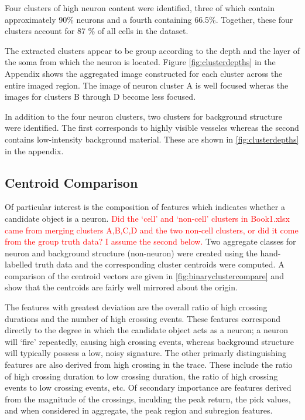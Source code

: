 \documentclass[10pt]{article}
\newcommand{\todo}[1]{\textcolor{red}{#1}}
\begin{document}
Four clusters of high neuron content were identified, three of which contain approximately \num{90}\% neurons and a fourth containing \num{66.5}\%. Together, these four clusters account for \num{87}
\% of all cells in the dataset.

The extracted clusters appear to be group according to the depth and the layer of the soma from which the neuron is located. 
Figure \cref{fig:clusterdepths} in the Appendix shows the aggregated image constructed for each cluster across the entire imaged region. 
The image of neuron cluster A is well focused wheras the images for clusters B through D become less focused. 

In addition to the four neuron clusters, two clusters for background structure were identified. The first corresponds to highly visible vesseles whereas the second contains low-intensity background material. These are shown in \cref{fig:clusterdepths} in the appendix.

\subsection{Centroid Comparison}

Of particular interest is the composition of features which indicates whether a candidate object is a neuron. 
\todo{Did the `cell' and `non-cell' clusters in Book1.xlsx came from merging clusters A,B,C,D and the two non-cell clusters, or did it come from the group truth data? I assume the second below.}
Two aggregate classes for neuron and background structure (non-neuron) were created using the hand-labelled truth data and the corresponding cluster centroids were computed.
A comparison of the centroid vectors are given in \cref{fig:binaryclustercompare} and show that the centroids are fairly well mirrored about the origin.

The features with greatest deviation are the overall ratio of high crossing durations and the number of high crossing events. These features correspond directly to the degree in which the candidate object acts as a neuron; a neuron will `fire' repeatedly, causing high crossing events, whereas background structure will typically possess a low, noisy signature. The other primarly distinguishing features are also derived from high crossing in the trace. These include the ratio of high crossing duration to low crossing duration, the ratio of high crossing events to low crossing events, etc. Of secondary importance are features derived from the magnitude of the crossings, inculding the peak return, the pick values, and when considered in aggregate, the peak region and subregion features. 
\end{document}
